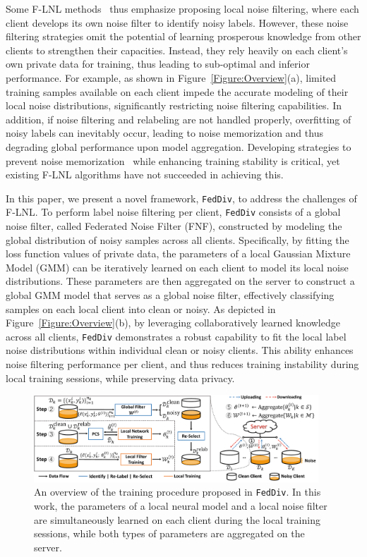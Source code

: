 \documentclass[letterpaper]{article} %
\begin{document}
Some F-LNL methods~\cite{kim2022fedrn,xu2022fedcorr} thus emphasize proposing local noise filtering, where each client develops its own noise filter to identify noisy labels. However, these noise filtering strategies omit the potential of learning prosperous knowledge from other clients to strengthen their capacities. Instead, they rely heavily on each client’s own private data for training, thus leading to sub-optimal and inferior performance. For example, as shown in Figure~\ref{Figure:Overview}(a), limited training samples available on each client impede the accurate modeling of their local noise distributions, significantly restricting noise filtering capabilities. In addition, if noise filtering and relabeling are not handled properly, overfitting of noisy labels can inevitably occur, leading to noise memorization and thus degrading global performance upon model aggregation. Developing strategies to prevent noise memorization~\cite{noisememory6} while enhancing training stability is critical, yet existing F-LNL algorithms have not succeeded in achieving this.
 
In this paper, we present a novel framework, \texttt{FedDiv}, to address the challenges of F-LNL. To perform label noise filtering per client, \texttt{FedDiv} consists of a global noise filter, called Federated Noise Filter (FNF), constructed by modeling the global distribution of noisy samples across all clients. Specifically, by fitting the loss function values of private data, the parameters of a local Gaussian Mixture Model (GMM) can be iteratively learned on each client to model its local noise distributions. These parameters are then aggregated on the server to construct a global GMM model that serves as a global noise filter, effectively classifying samples on each local client into clean or noisy. As depicted in Figure~\ref{Figure:Overview}(b), by leveraging collaboratively learned knowledge across all clients, \texttt{FedDiv} demonstrates a robust capability to fit the local label noise distributions within individual clean or noisy clients. This ability enhances noise filtering performance per client, and thus reduces training instability during local training sessions, while preserving data privacy.

\begin{figure}[t]
    \centering
    \includegraphics[width=0.95\textwidth]{figures/framework.pdf}
    
    \caption{An overview of the training procedure proposed in \texttt{FedDiv}.
    In this work, the parameters of a local neural model and a local noise filter are simultaneously learned on each client during the local training sessions, while both types of parameters are aggregated on the server.}
    \label{Figure:Framework}
    
\end{figure}
\end{document}
